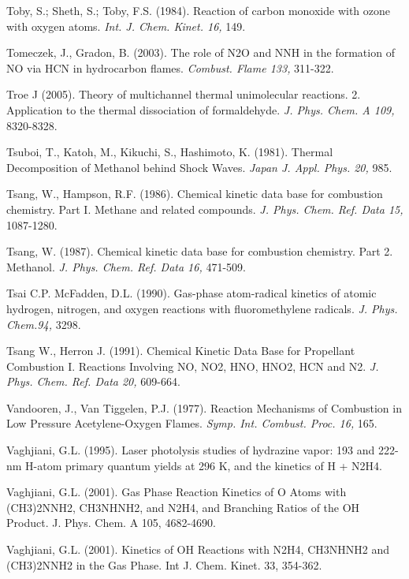 \documentclass[12pt,landscape]{article}
\newcounter{reaction}
\newcounter{photo}
\begin{document}
Toby, S.; Sheth, S.; Toby, F.S. (1984).  Reaction of carbon monoxide with ozone with oxygen atoms. {\em Int. J. Chem. Kinet. 16,} 149.

Tomeczek, J., Gradon, B. (2003). The role of N2O and NNH in the formation of NO via HCN in hydrocarbon flames. {\em  Combust. Flame 133,} 311-322.

Troe J (2005). Theory of multichannel thermal unimolecular reactions. 2. Application to the thermal dissociation of formaldehyde. {\em J. Phys. Chem. A 109,} 8320-8328.

Tsuboi, T., Katoh, M., Kikuchi, S., Hashimoto, K. (1981). Thermal Decomposition of Methanol behind Shock Waves.  {\em Japan J. Appl. Phys. 20,} 985.

Tsang, W., Hampson, R.F. (1986). Chemical kinetic data base for combustion chemistry. Part I. Methane and related compounds.  {\em J. Phys. Chem. Ref. Data 15,} 1087-1280.

Tsang, W. (1987).  Chemical kinetic data base for combustion chemistry. Part 2. Methanol.  {\em J. Phys. Chem. Ref. Data 16,} 471-509.

Tsai C.P. McFadden, D.L. (1990). Gas-phase atom-radical kinetics of atomic hydrogen, nitrogen, and oxygen reactions with fluoromethylene radicals.  {\em J. Phys. Chem.94,} 3298.

Tsang W., Herron J. (1991).
Chemical Kinetic Data Base for Propellant Combustion I. Reactions Involving NO, NO2, HNO, HNO2, HCN and N2.
{\em J. Phys. Chem. Ref. Data 20,} 609-664.

Vandooren, J., Van Tiggelen, P.J. (1977). Reaction Mechanisms of Combustion in Low Pressure Acetylene-Oxygen Flames. {\em Symp. Int. Combust. Proc. 16,} 165.

Vaghjiani, G.L. (1995).  Laser photolysis studies of hydrazine vapor: 193 and 222-nm H-atom primary quantum yields at 296 K, and the kinetics of H + N2H4.   

Vaghjiani, G.L. (2001).  Gas Phase Reaction Kinetics of O Atoms with (CH3)2NNH2, CH3NHNH2, and N2H4, and Branching Ratios of the OH Product.  J. Phys. Chem. A 105, 4682-4690.

Vaghjiani, G.L. (2001).  Kinetics of OH Reactions with N2H4, CH3NHNH2 and (CH3)2NNH2 in the Gas Phase.   Int J. Chem. Kinet. 33, 354-362.
\end{document}
